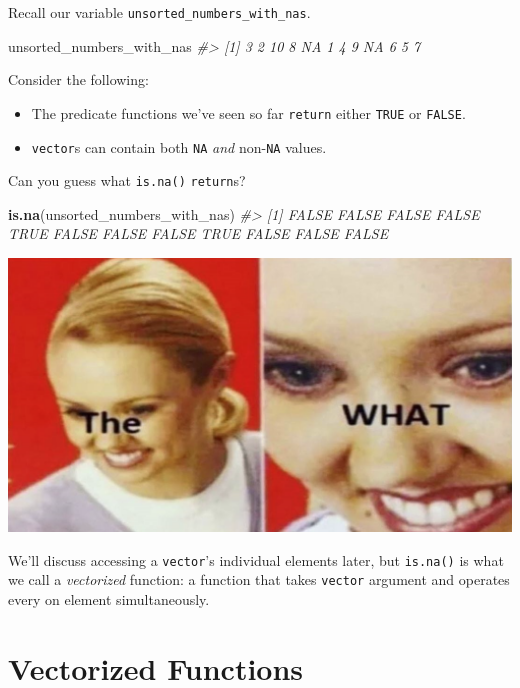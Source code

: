 \documentclass[
]{report}
\newenvironment{Shaded}{\begin{snugshade}}{\end{snugshade}}
\newcommand{\CommentTok}[1]{\textcolor[rgb]{0.56,0.35,0.01}{\textit{#1}}}
\newcommand{\KeywordTok}[1]{\textcolor[rgb]{0.13,0.29,0.53}{\textbf{#1}}}
\newcommand{\NormalTok}[1]{#1}
\providecommand{\tightlist}{%
  \setlength{\itemsep}{0pt}\setlength{\parskip}{0pt}}
\begin{document}
Recall our variable \texttt{unsorted\_numbers\_with\_nas}.

\begin{Shaded}
\begin{Highlighting}[]
\NormalTok{unsorted\_numbers\_with\_nas}
\CommentTok{\#\textgreater{}  [1]  3  2 10  8 NA  1  4  9 NA  6  5  7}
\end{Highlighting}
\end{Shaded}

Consider the following:

\begin{itemize}
\tightlist
\item
  The predicate functions we've seen so far \texttt{return} either \texttt{TRUE} or \texttt{FALSE}.
\item
  \texttt{vector}s can contain both \texttt{NA} \emph{and} non-\texttt{NA} values.
\end{itemize}

Can you guess what \texttt{is.na()} \texttt{return}s?

\begin{Shaded}
\begin{Highlighting}[]
\KeywordTok{is.na}\NormalTok{(unsorted\_numbers\_with\_nas)}
\CommentTok{\#\textgreater{}  [1] FALSE FALSE FALSE FALSE  TRUE FALSE FALSE FALSE  TRUE FALSE FALSE FALSE}
\end{Highlighting}
\end{Shaded}

\begin{center}\includegraphics[width=0.7\linewidth]{images/the-what} \end{center}

We'll discuss accessing a \texttt{vector}'s individual elements later, but \texttt{is.na()} is what we call a \emph{vectorized} function: a function that takes \texttt{vector} argument and operates every on element simultaneously.

\hypertarget{vectorized-functions}{%
\section{Vectorized Functions}\label{vectorized-functions}}
\end{document}
